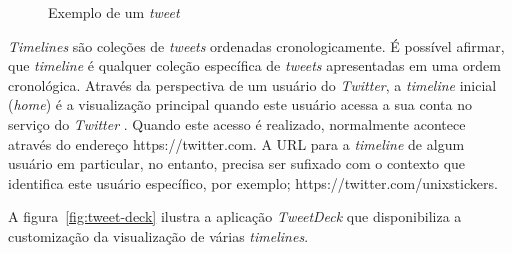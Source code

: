 \begin{figure}[h]
  \centering
  \vspace{0.1cm}
  \caption{Exemplo de um \textit{tweet}}
  \label{fig:tweet}
\end{figure}


\textit{Timelines} são coleções de \textit{tweets} ordenadas cronologicamente. É possível afirmar, que \textit{timeline} é qualquer coleção específica de \textit{tweets} apresentadas em uma ordem cronológica. Através da perspectiva de um usuário do \textit{Twitter}, a \textit{timeline} inicial (\textit{home}) é a visualização principal quando este usuário acessa a sua conta no serviço do \textit{Twitter} \cite{mining-social-web}. Quando este acesso é realizado, normalmente acontece através do endereço https://twitter.com. A URL para a \textit{timeline} de algum usuário em particular, no entanto, precisa ser sufixado com o contexto que identifica este usuário específico, por exemplo; https://twitter.com/unixstickers.

A figura~\ref{fig:tweet-deck} ilustra a aplicação \textit{TweetDeck} que disponibiliza a customização da visualização de várias \textit{timelines}.

